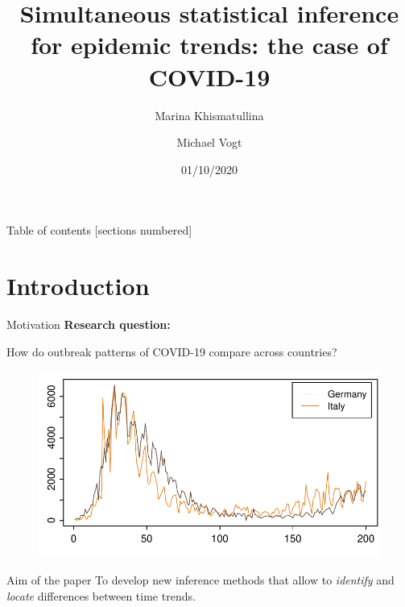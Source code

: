 \documentclass[10pt]{beamer}
\title{Simultaneous statistical inference for epidemic trends: the case of COVID-19}
\date{01/10/2020}
\author{Marina Khismatullina \and Michael Vogt}
\begin{document}
\maketitle

\begin{frame}{Table of contents}
  [sections numbered]
  \tableofcontents[hideallsubsections]
\end{frame}

\section{Introduction}


\begin{frame}{Motivation}
	\textbf{Research question:}
	
	How do outbreak patterns of COVID-19 compare across countries?
	\begin{figure}
    		\centering
    		\includegraphics[height=0.45\textheight]{plots/Germany_and_Italy.pdf}
    		\label{fig:DEUvsITA}
  	\end{figure}\pause
	\begin{block}{Aim of the paper}
	To develop new inference methods that allow to \textit{identify} and \textit{locate} differences between time trends.
	\end{block}
\end{frame}
\end{document}
